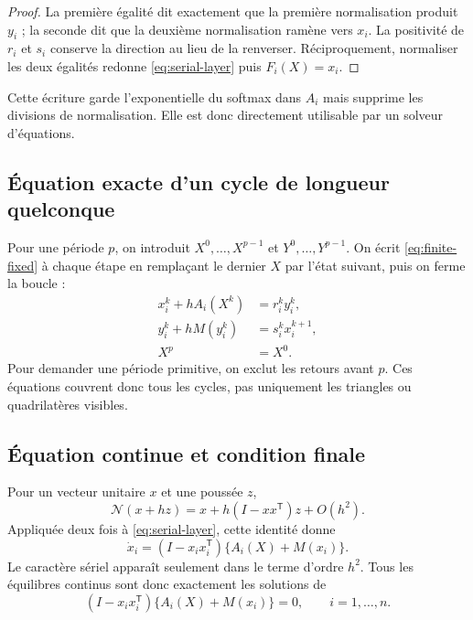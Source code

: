 \documentclass[11pt,a4paper]{article}
\theoremstyle{definition}
\newcommand{\T}{\mathsf T}
\newcommand{\N}{\mathcal N}
\begin{document}
\begin{proof}
La première égalité dit exactement que la première normalisation produit $y_i$ ; la
seconde dit que la deuxième normalisation ramène vers $x_i$. La positivité de $r_i$ et
$s_i$ conserve la direction au lieu de la renverser. Réciproquement, normaliser les
deux égalités redonne \eqref{eq:serial-layer} puis $F_i(X)=x_i$.
\end{proof}

Cette écriture garde l'exponentielle du softmax dans $A_i$ mais supprime les divisions
de normalisation. Elle est donc directement utilisable par un solveur d'équations.

\subsection{Équation exacte d'un cycle de longueur quelconque}

Pour une période $p$, on introduit $X^0,\ldots,X^{p-1}$ et $Y^0,\ldots,Y^{p-1}$. On
écrit \eqref{eq:finite-fixed} à chaque étape en remplaçant le dernier $X$ par l'état
suivant, puis on ferme la boucle :
\begin{align}
 x_i^k+hA_i(X^k)&=r_i^k y_i^k,\\
 y_i^k+hM(y_i^k)&=s_i^k x_i^{k+1},\\
 X^p&=X^0.\label{eq:all-cycles}
\end{align}
Pour demander une période primitive, on exclut les retours avant $p$. Ces équations
couvrent donc tous les cycles, pas uniquement les triangles ou quadrilatères visibles.

\subsection{Équation continue et condition finale}

Pour un vecteur unitaire $x$ et une poussée $z$,
\[
 \N(x+hz)=x+h(I-xx^{\T})z+O(h^2).
\]
Appliquée deux fois à \eqref{eq:serial-layer}, cette identité donne
\begin{equation}
 \boxed{\quad\dot x_i=(I-x_ix_i^{\T})\{A_i(X)+M(x_i)\}.\quad}\label{eq:continuous}
\end{equation}
Le caractère sériel apparaît seulement dans le terme d'ordre $h^2$. Tous les
équilibres continus sont donc exactement les solutions de
\begin{equation}
 \boxed{\quad(I-x_ix_i^{\T})\{A_i(X)+M(x_i)\}=0,
 \qquad i=1,\ldots,n.\quad}\label{eq:continuous-equilibrium}
\end{equation}
\end{document}
